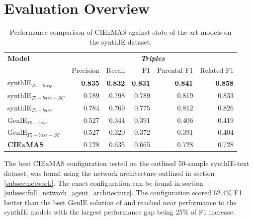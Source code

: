 \documentclass[a4paper,oneside,bibliography=totoc]{scrbook}
\begin{document}
\section{Evaluation Overview}
\label{sec:evaluation_overview}

\begin{table}[h]
  \centering
  \begin{tabular}{l|rrrrr}
    \toprule
    \textbf{Model}         & \multicolumn{5}{c}{\textit{\textbf{Triples}}}                                                                     \\
                           & Precision                                     & Recall         & F1             & Parental F1    & Related F1     \\
    \midrule
    synthIE$_{T5-large}$   & \textbf{0.835}                                & \textbf{0.832} & \textbf{0.831} & \textbf{0.841} & \textbf{0.858} \\
    synthIE$_{T5-base-SC}$ & 0.789                                         & 0.798          & 0.789          & 0.819          & 0.833          \\
    synthIE$_{T5-base}$    & 0.784                                         & 0.769          & 0.775          & 0.812          & 0.826          \\
    GenIE$_{T5-base}$      & 0.527                                         & 0.344          & 0.391          & 0.406          & 0.419          \\
    GenIE$_{T5-base-SC}$   & 0.527                                         & 0.320          & 0.372          & 0.391          & 0.404          \\
    \midrule
    \textbf{CIExMAS}       & 0.728                                         & 0.635          & 0.665          & 0.728          & 0.728          \\
    \bottomrule
  \end{tabular}
  \caption{Performance comparison of CIExMAS against state-of-the-art models on the synthIE dataset.}
  \label{tab:evaluation_overview}
\end{table}

The best CIExMAS configuration tested on the outlined 50-sample synthIE-text dataset, was found using the network architecture outlined in section \ref{subsec:network}. The exact configuration can be found in section \ref{subsec:full_network_agent_architecture}. The configuration scored 62.4\% F1 better than the best GenIE solution of \citet{Josifoski2021} and reached near performance to the synthIE models with the largest performance gap being 25\% of F1 increase.
\end{document}
